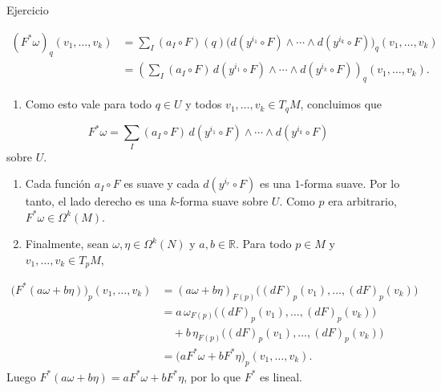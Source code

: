 \begin{bookproof}{Ejercicio}
\begin{enumerate}[start=5]
\end{enumerate}
\[
\begin{aligned}(F^*\omega)_q(v_1,\ldots,v_k)&=\sum_I(a_I\circ F)(q)\bigl(d(y^{i_1}\circ F)\wedge\cdots\wedge d(y^{i_k}\circ F)\bigr)_q(v_1,\ldots,v_k)\\&=\left(\sum_I(a_I\circ F)\,d(y^{i_1}\circ F)\wedge\cdots\wedge d(y^{i_k}\circ F)\right)_q(v_1,\ldots,v_k).\end{aligned}
\]
\begin{enumerate}[start=6]
\item Como esto vale para todo $q\in U$ y todos $v_1,\ldots,v_k\in T_qM$, concluimos que
\end{enumerate}
\[
F^*\omega=\sum_I(a_I\circ F)\,d(y^{i_1}\circ F)\wedge\cdots\wedge d(y^{i_k}\circ F)
\]
sobre $U$.

\begin{enumerate}[start=7]
\item Cada función $a_I\circ F$ es suave y cada $d(y^{i_r}\circ F)$ es una $1$-forma suave. Por lo tanto, el lado derecho es una $k$-forma suave sobre $U$. Como $p$ era arbitrario, $F^*\omega\in\Omega^k(M)$.
\item Finalmente, sean $\omega,\eta\in\Omega^k(N)$ y $a,b\in\mathbb R$. Para todo $p\in M$ y $v_1,\ldots,v_k\in T_pM$,
\end{enumerate}
\[
\begin{aligned}\bigl(F^*(a\omega+b\eta)\bigr)_p(v_1,\ldots,v_k)&=(a\omega+b\eta)_{F(p)}\bigl((dF)_p(v_1),\ldots,(dF)_p(v_k)\bigr)\\&=a\,\omega_{F(p)}\bigl((dF)_p(v_1),\ldots,(dF)_p(v_k)\bigr)\\&\quad+b\,\eta_{F(p)}\bigl((dF)_p(v_1),\ldots,(dF)_p(v_k)\bigr)\\&=\bigl(aF^*\omega+bF^*\eta\bigr)_p(v_1,\ldots,v_k).\end{aligned}
\]
Luego $F^*(a\omega+b\eta)=aF^*\omega+bF^*\eta$, por lo que $F^*$ es lineal.


\end{bookproof}
